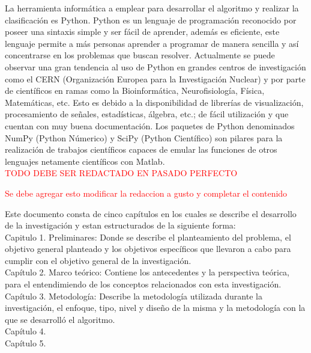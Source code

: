 La herramienta informática a emplear para desarrollar el algoritmo y realizar la clasificación es Python. Python es un lenguaje de programación reconocido por poseer una sintaxis simple y ser fácil de aprender, además es eficiente, este lenguaje permite a más personas aprender a programar de manera sencilla y así concentrarse en los problemas que buscan resolver. Actualmente se puede observar una gran tendencia al uso de Python en grandes centros de investigación como el CERN (Organización Europea para la Investigación Nuclear) y por parte de científicos en ramas como la Bioinformática, Neurofisiología, Física, Matemáticas, etc. Esto es debido a la disponibilidad de librerías de visualización, procesamiento de señales, estadísticas, álgebra, etc.; de fácil utilización y que cuentan con muy buena documentación. Los paquetes de Python denominados NumPy (Python Númerico) y SciPy (Python Científico) son pilares para la realización de trabajos científicos capaces de emular las funciones de otros lenguajes netamente científicos con Matlab.\\


 \textcolor{red}{ TODO DEBE SER REDACTADO EN PASADO PERFECTO}


 \textcolor{red}{ Se debe agregar esto modificar la redaccion a gusto y completar el contenido}

Este documento consta de cinco capítulos en los cuales se describe el desarrollo  de la investigación  y estan estructurados de la siguiente forma:\\
Capitulo 1. Preliminares: Donde se describe el planteamiento del problema, el objetivo general planteado y los objetivos específicos que llevaron  a cabo para cumplir con el objetivo general de  la investigación.\\
Capítulo 2. Marco teórico: Contiene los antecedentes y la perspectiva teórica, para el entendimiendo
de los conceptos relacionados con esta investigación.\\
Capítulo 3. Metodología: Describe la metodología utilizada durante la investigación, el enfoque,
tipo, nivel y dise\~no de la misma y la metodología con la que se desarrolló el algoritmo.\\
Capítulo 4. \\
Capítulo 5.\\


